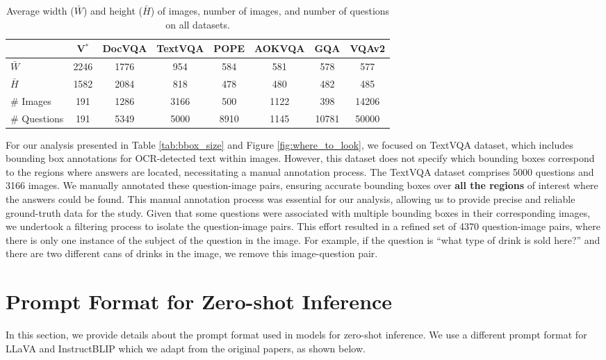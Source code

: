 \begin{table}[h]
\caption{Average width ($\bar{W}$) and height ($\bar{H}$) of images, number of images, and number of questions on all datasets.}

\centering
\begin{tabular}{lccccccc}
\toprule
 & V$^{*}$ & DocVQA & TextVQA & POPE & AOKVQA & GQA & VQAv2 \\
\midrule
$\bar{W}$  & 2246 & 1776 & 954 & 584 & 581 & 578 & 577\\ 
$\bar{H}$ & 1582 & 2084 & 818 & 478 & 480 & 482 & 485\\ 
\# Images & 191 & 1286 & 3166 & 500 & 1122 & 398 & 14206 \\
\# Questions & 191 & 5349 & 5000 & 8910 & 1145 & 10781 & 50000 \\

\bottomrule
\end{tabular}
\label{tab:example}
\end{table}

For our analysis presented in Table \ref{tab:bbox_size} and Figure \ref{fig:where_to_look}, we focused on TextVQA dataset, which includes bounding box annotations for OCR-detected text within images. However, this dataset does not specify which bounding boxes correspond to the regions where answers are located, necessitating a manual annotation process.
The TextVQA dataset comprises 5000 questions and 3166 images. We manually annotated these question-image pairs, ensuring accurate bounding boxes over \textbf{all the regions} of interest where the answers could be found.
This manual annotation process was essential for our analysis, allowing us to provide precise and reliable ground-truth data for the study.
Given that some questions were associated with multiple bounding boxes in their corresponding images, we undertook a filtering process to isolate the question-image pairs. This effort resulted in a refined set of 4370 question-image pairs, where there is only one instance of the subject of the question in the image. For example, if the question is ``what type of drink is sold here?'' and there are two different cans of drinks in the image, we remove this image-question pair.


\section{Prompt Format for Zero-shot Inference}
\label{app:zeroshot_instruction}

In this section, we provide details about the prompt format used in models for zero-shot inference. We use a different prompt format for LLaVA and InstructBLIP which we adapt from the original papers, as shown below.


